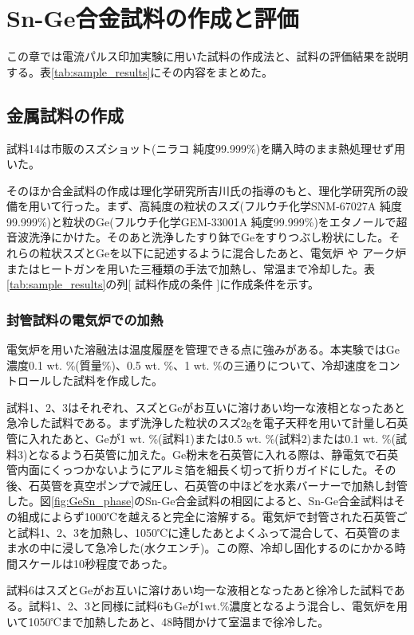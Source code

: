 \section{Sn-Ge合金試料の作成と評価}
この章では電流パルス印加実験に用いた試料の作成法と、試料の評価結果を説明する。表\ref{tab:sample_results}にその内容をまとめた。

\subsection{金属試料の作成}
試料14は市販のスズショット(ニラコ 純度99.999\%)を購入時のまま熱処理せず用いた。

そのほか合金試料の作成は理化学研究所吉川氏の指導のもと、理化学研究所の設備を用いて行った。まず、高純度の粒状のスズ(フルウチ化学SNM-67027A 純度99.999\%)と粒状のGe(フルウチ化学GEM-33001A 純度99.999\%)をエタノールで超音波洗浄にかけた。そのあと洗浄したすり鉢でGeをすりつぶし粉状にした。それらの粒状スズとGeを以下に記述するように混合したあと、電気炉%
や
アーク炉%
またはヒートガンを用いた三種類の手法で加熱し、常温まで冷却した。表\ref{tab:sample_results}の列[ 試料作成の条件 ]に作成条件を示す。

\subsubsection{封管試料の電気炉での加熱}
電気炉を用いた溶融法は温度履歴を管理できる点に強みがある。本実験ではGe濃度0.1 wt. \%(質量\%)、0.5 wt. \%、1 wt. \%の三通りについて、冷却速度をコントロールした試料を作成した。

試料1、2、3はそれぞれ、スズとGeがお互いに溶けあい均一な液相となったあと急冷した試料である。まず洗浄した粒状のスズ2gを電子天秤を用いて計量し石英管に入れたあと、Geが1 wt. \%(試料1)または0.5 wt. \%(試料2)または0.1 wt. \%(試料3)となるよう石英管に加えた。Ge粉末を石英管に入れる際は、静電気で石英管内面にくっつかないようにアルミ箔を細長く切って折りガイドにした。その後、石英管を真空ポンプで減圧し、石英管の中ほどを水素バーナーで加熱し封管した。図\ref{fig:GeSn_phase}のSn-Ge合金試料の相図によると、Sn-Ge合金試料はその組成によらず1000℃を越えると完全に溶解する。電気炉で封管された石英管ごと試料1、2、3を加熱し、1050℃に達したあとよくふって混合して、石英管のまま水の中に浸して急冷した(水クエンチ)。この際、冷却し固化するのにかかる時間スケールは10秒程度であった。

試料6はスズとGeがお互いに溶けあい均一な液相となったあと徐冷した試料である。試料1、2、3と同様に試料6もGeが1wt.\%濃度となるよう混合し、電気炉を用いて1050℃まで加熱したあと、48時間かけて室温まで徐冷した。

